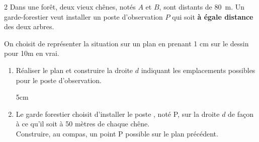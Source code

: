 \documentclass[a4paper]{book}
\begin{document}
{    \begin{exerciceNote}{2}
        Dans une forêt, deux vieux chênes, notés $A$ et $B$, sont distants de $80$~m. Un garde-forestier veut installer un poste d'observation $P$ qui soit \textbf{à égale distance} des deux arbres.

        On choisit de représenter la situation sur un plan en prenant 1 cm sur le dessin pour 10m en vrai.

        \begin{enumerate}
            \item Réaliser le plan et construire la droite $d$ indiquant les emplacements possibles pour le poste d'observation.

            \begin{ZoneReponse}{5cm}
            \end{ZoneReponse}

            \item Le garde forestier choisit d'installer le poste , noté P, sur la droite $d$ de façon à ce qu'il soit à 50 mètres de chaque chêne.\\
            Construire, au compas, un point P possible sur le plan précédent.
        \end{enumerate}
    \end{exerciceNote}
    
    
}
\end{document}
